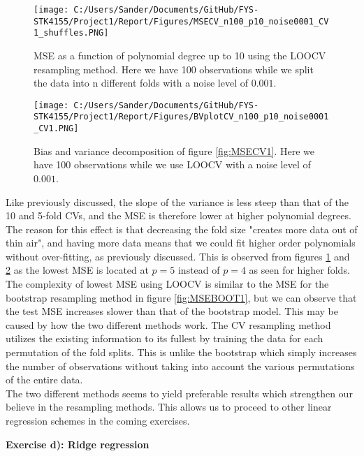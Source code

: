 \documentclass[12pt,a4paper]{article}
\begin{document}
\begin{figure}[H]
\centering
\texttt{[image: C:/Users/Sander/Documents/GitHub/FYS-STK4155/Project1/Report/Figures/MSECV\_n100\_p10\_noise0001\_CV1\_shuffles.PNG]}
\caption{\label{fig:MSECV3} MSE as a function of polynomial degree up to 10 using the LOOCV resampling method. Here we have 100 observations while we split the data into n different folds with a noise level of $0.001$.}
\end{figure}

\begin{figure}[H]
\centering
\texttt{[image: C:/Users/Sander/Documents/GitHub/FYS-STK4155/Project1/Report/Figures/BVplotCV\_n100\_p10\_noise0001\_CV1.PNG]}
\caption{\label{fig:BVCV3} Bias and variance decomposition of figure \ref{fig:MSECV1}. Here we have 100 observations while we use LOOCV with a noise level of $0.001$.}
\end{figure}

\noindent Like previously discussed, the slope of the variance is less steep than that of the 10 and 5-fold CVs, and the MSE is therefore lower at higher polynomial degrees. The reason for this effect is that decreasing the fold size "creates more data out of thin air", and having more data means that we could fit higher order polynomials without over-fitting, as previously discussed. This is observed from figures \ref{fig:MSECV3} and \ref{fig:BVCV3} as the lowest MSE is located at $p = 5$ instead of $p = 4$ as seen for higher folds. The complexity of lowest MSE using LOOCV is similar to the MSE for the bootstrap resampling method in figure \ref{fig:MSEBOOT1}, but we can observe that the test MSE increases slower than that of the bootstrap model. This may be caused by how the two different methods work. The CV resampling method utilizes the existing information to its fullest by training the data for each permutation of the fold splits. This is unlike the bootstrap which simply increases the number of observations without taking into account the various permutations of the entire data.
\\
The two different methods seems to yield preferable results which strengthen our believe in the resampling methods. This allows us to proceed to other linear regression schemes in the coming exercises.

\newpage

\begin{center}
\Large{\textbf{Exercise d): Ridge regression}}
\end{center}
\end{document}
